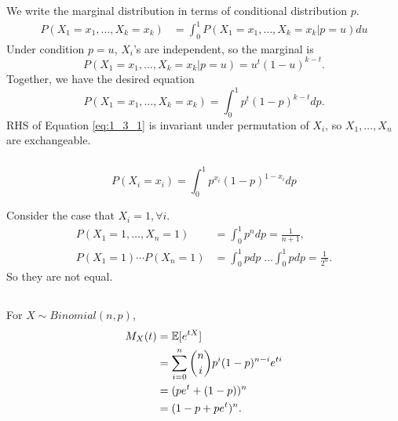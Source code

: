 \subsubsection{} %

We write the marginal distribution in terms of conditional distribution \wrt $p$.
\begin{align}
    P(X_1=x_1,\dots,X_k=x_k)
        &= \int_0^1 P(X_1=x_1,\dots,X_k=x_k|p=u) du
\end{align}
Under condition $p=u$, $X_i$'s are independent,
so the marginal is
\begin{equation}
    P(X_1=x_1,\dots,X_k=x_k|p=u) = u^t(1-u)^{k-t}.
\end{equation}
Together, we have the desired equation
\begin{equation} \label{eq:1_3_1}
    P(X_1=x_1,\dots,X_k=x_k) = \int_0^1 p^t(1-p)^{k-t}dp.
\end{equation}
RHS of Equation \eqref{eq:1_3_1} is invariant under permutation of $X_i$,
so $X_1,\dots,X_n$ are exchangeable.

\subsubsection{} %

\begin{equation}
    P(X_i=x_i) = \int_0^1 p^{x_i}(1-p)^{1-x_i} dp
\end{equation}

Consider the case that $X_i=1, \forall i$.
\begin{align}
    P(X_1=1,\dots,X_n=1) &= \int_0^1 p^n dp = \frac{1}{n+1}, \\
    P(X_1=1)\cdots P(X_n=1) &= \int_0^1 p dp\; \dots  \int_0^1 p dp = \frac{1}{2^n}.
\end{align}
So they are not equal.


\subsection{} %

\subsubsection{} %

For $X\sim Binomial(n,p)$,
\begin{align}
    M_X(t)
        &= \mathbb{E}[e^{tX}] \\
        &= \sum_{i=0}^n \binom{n}{i}p^i(1-p)^{n-i}e^{ti} \\
        &= (pe^t + (1-p))^n \\
        &= (1-p+pe^t)^n.
\end{align}

